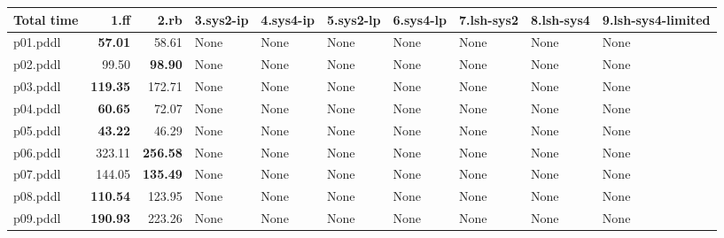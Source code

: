 \documentclass{article}
\begin{document}
\begin{tabular}{@{}lrrrrrrrrr@{}}
Total time & 1.ff & 2.rb & 3.sys2-ip & 4.sys4-ip & 5.sys2-lp & 6.sys4-lp & 7.lsh-sys2 & 8.lsh-sys4 & 9.lsh-sys4-limited \\
\midrule
p01.pddl & \textbf{57.01} & 58.61 & \multicolumn{1}{|l|}{None} & \multicolumn{1}{|l|}{None} & \multicolumn{1}{|l|}{None} & \multicolumn{1}{|l|}{None} & \multicolumn{1}{|l|}{None} & \multicolumn{1}{|l|}{None} & \multicolumn{1}{|l|}{None} \\
p02.pddl & 99.50 & \textbf{98.90} & \multicolumn{1}{|l|}{None} & \multicolumn{1}{|l|}{None} & \multicolumn{1}{|l|}{None} & \multicolumn{1}{|l|}{None} & \multicolumn{1}{|l|}{None} & \multicolumn{1}{|l|}{None} & \multicolumn{1}{|l|}{None} \\
p03.pddl & \textbf{119.35} & 172.71 & \multicolumn{1}{|l|}{None} & \multicolumn{1}{|l|}{None} & \multicolumn{1}{|l|}{None} & \multicolumn{1}{|l|}{None} & \multicolumn{1}{|l|}{None} & \multicolumn{1}{|l|}{None} & \multicolumn{1}{|l|}{None} \\
p04.pddl & \textbf{60.65} & 72.07 & \multicolumn{1}{|l|}{None} & \multicolumn{1}{|l|}{None} & \multicolumn{1}{|l|}{None} & \multicolumn{1}{|l|}{None} & \multicolumn{1}{|l|}{None} & \multicolumn{1}{|l|}{None} & \multicolumn{1}{|l|}{None} \\
p05.pddl & \textbf{43.22} & 46.29 & \multicolumn{1}{|l|}{None} & \multicolumn{1}{|l|}{None} & \multicolumn{1}{|l|}{None} & \multicolumn{1}{|l|}{None} & \multicolumn{1}{|l|}{None} & \multicolumn{1}{|l|}{None} & \multicolumn{1}{|l|}{None} \\
p06.pddl & 323.11 & \textbf{256.58} & \multicolumn{1}{|l|}{None} & \multicolumn{1}{|l|}{None} & \multicolumn{1}{|l|}{None} & \multicolumn{1}{|l|}{None} & \multicolumn{1}{|l|}{None} & \multicolumn{1}{|l|}{None} & \multicolumn{1}{|l|}{None} \\
p07.pddl & 144.05 & \textbf{135.49} & \multicolumn{1}{|l|}{None} & \multicolumn{1}{|l|}{None} & \multicolumn{1}{|l|}{None} & \multicolumn{1}{|l|}{None} & \multicolumn{1}{|l|}{None} & \multicolumn{1}{|l|}{None} & \multicolumn{1}{|l|}{None} \\
p08.pddl & \textbf{110.54} & 123.95 & \multicolumn{1}{|l|}{None} & \multicolumn{1}{|l|}{None} & \multicolumn{1}{|l|}{None} & \multicolumn{1}{|l|}{None} & \multicolumn{1}{|l|}{None} & \multicolumn{1}{|l|}{None} & \multicolumn{1}{|l|}{None} \\
p09.pddl & \textbf{190.93} & 223.26 & \multicolumn{1}{|l|}{None} & \multicolumn{1}{|l|}{None} & \multicolumn{1}{|l|}{None} & \multicolumn{1}{|l|}{None} & \multicolumn{1}{|l|}{None} & \multicolumn{1}{|l|}{None} & \multicolumn{1}{|l|}{None} \\

\end{tabular}
\end{document}
